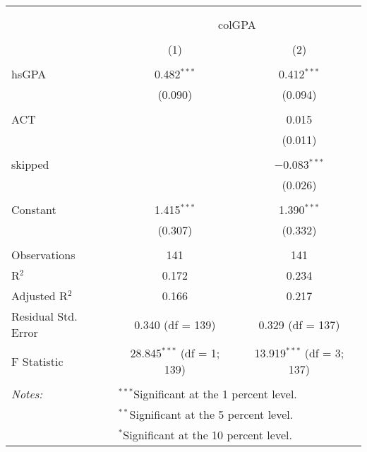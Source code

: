 \documentclass{article}
\begin{document}
\begin{table}[!htbp] \centering 
  \caption{} 
  \label{} 
\begin{tabular}{@{\extracolsep{5pt}}lcc} 
\\[-1.8ex]\hline 
\hline \\[-1.8ex] 
\\[-1.8ex] & \multicolumn{2}{c}{colGPA} \\ 
\\[-1.8ex] & (1) & (2)\\ 
\hline \\[-1.8ex] 
 hsGPA & 0.482$^{***}$ & 0.412$^{***}$ \\ 
  & (0.090) & (0.094) \\ 
  & & \\ 
 ACT &  & 0.015 \\ 
  &  & (0.011) \\ 
  & & \\ 
 skipped &  & $-$0.083$^{***}$ \\ 
  &  & (0.026) \\ 
  & & \\ 
 Constant & 1.415$^{***}$ & 1.390$^{***}$ \\ 
  & (0.307) & (0.332) \\ 
  & & \\ 
Observations & 141 & 141 \\ 
R$^{2}$ & 0.172 & 0.234 \\ 
Adjusted R$^{2}$ & 0.166 & 0.217 \\ 
Residual Std. Error & 0.340 (df = 139) & 0.329 (df = 137) \\ 
F Statistic & 28.845$^{***}$ (df = 1; 139) & 13.919$^{***}$ (df = 3; 137) \\ 
\hline \\[-1.8ex] 
\textit{Notes:} & \multicolumn{2}{l}{$^{***}$Significant at the 1 percent level.} \\ 
 & \multicolumn{2}{l}{$^{**}$Significant at the 5 percent level.} \\ 
 & \multicolumn{2}{l}{$^{*}$Significant at the 10 percent level.} \\ 
\end{tabular} 
\end{table} 
\end{document}
